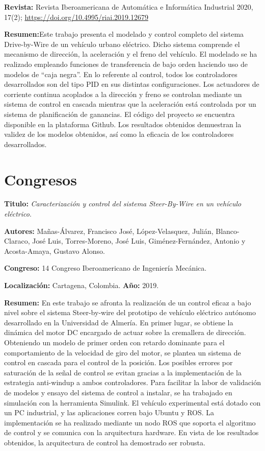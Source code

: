 \textbf{Revista:} Revista Iberoamericana de Automática e Informática Industrial 2020, 17(2); \url{https://doi.org/10.4995/riai.2019.12679}

\textbf{Resumen:}Este trabajo presenta el modelado y control completo del sistema Drive-by-Wire de un vehículo urbano eléctrico. Dicho sistema comprende el mecanismo de dirección, la aceleración y el freno del vehículo. El modelado se ha realizado empleando funciones de transferencia de bajo orden haciendo uso de modelos de “caja negra”. En lo referente al control, todos los controladores desarrollados son del tipo PID en sus distintas configuraciones. Los actuadores de corriente continua acoplados a la dirección y freno se controlan mediante un sistema de control en cascada mientras que la aceleración está controlada por un sistema de planificación de ganancias. El código del proyecto se encuentra disponible en la plataforma Github. Los resultados obtenidos demuestran la validez de los modelos obtenidos, así como la eficacia de los controladores desarrollados.

\section{Congresos}
\textbf{Titulo:} \textit{Caracterización y control del sistema Steer-By-Wire en un vehículo eléctrico}\cite{manas2019CIBIM}.

\textbf{Autores:} Mañas-Álvarez, Francisco José, López-Velasquez, Julián, Blanco-Claraco, José Luis, Torres-Moreno, José Luis, Giménez-Fernández, Antonio y Acosta-Amaya, Gustavo Alonso.

\textbf{Congreso:} 14 Congreso Iberoamericano de Ingeniería Mecánica.

\textbf{Localización:} Cartagena, Colombia. \textbf{Año:} 2019. 

\textbf{Resumen:} En este trabajo se afronta la realización de un control eficaz a bajo nivel sobre el sistema Steer-by-wire del prototipo de vehículo eléctrico autónomo desarrollado en la Universidad de Almería. En primer lugar, se obtiene la dinámica del motor DC encargado de actuar sobre la cremallera de dirección. Obteniendo un modelo de primer orden con retardo dominante para el comportamiento de la velocidad de giro del motor, se plantea un sistema de control en cascada para el control de la posición. Los posibles errores por saturación de la señal de control se evitan gracias a la implementación de la estrategia anti-windup a ambos controladores. Para facilitar la labor de validación de modelos y ensayo del sistema de control a instalar, se ha trabajado en simulación con la herramienta Simulink. El vehículo experimental está dotado con un PC industrial, y las aplicaciones corren bajo Ubuntu y ROS. La implementación se ha realizado mediante un nodo ROS que soporta el algoritmo de control y se comunica con la arquitectura hardware. En vista de los resultados obtenidos, la arquitectura de control ha demostrado ser robusta.

\afterpage{\blankpage}